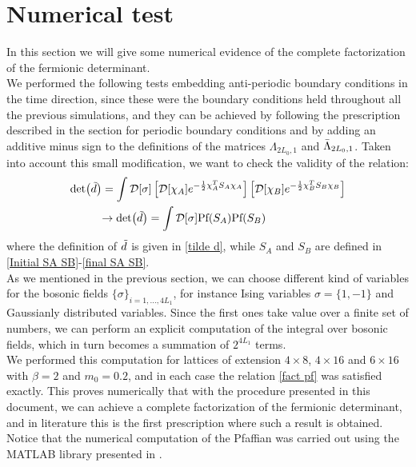 \section{Numerical test}
In this section we will give some numerical evidence of the complete factorization of the fermionic determinant.
\\ We performed the following tests embedding anti-periodic boundary conditions in the time direction, since these were the boundary conditions held throughout all the previous simulations, and they can be achieved by following the prescription described in the section for periodic boundary conditions and by adding an additive minus sign to the definitions of the matrices $\Lambda_{2L_0, 1}$ and $\Bar{\Lambda}_{2L_0, 1}$. Taken into account this small modification, we want to check the validity of the relation:
\begin{equation}\label{fact pf}
\begin{split}
\det (\Tilde{d}) = \int \mathcal{D}[\sigma] \left[\mathcal{D}[\chi_A] e^{-\frac{1}{2}\chi_A^T S_A \chi_A} \right] \left[\mathcal{D}[\chi_B] e^{-\frac{1}{2}\chi_B^T S_B \chi_B} \right] \\
        \rightarrow \det(\Tilde{d}) = \int \mathcal{D}[\sigma] \textrm{Pf}(S_A)\textrm{Pf}(S_B) \hspace{25mm}
\end{split}
\end{equation}
where the definition of $\Tilde{d}$ is given in \eqref{tilde d}, while $S_A$ and $S_B$ are defined in \eqref{Initial SA SB}-\eqref{final SA SB}.
\\ As we mentioned in the previous section, we can choose different kind of variables for the bosonic fields $\{\sigma\}_{i = 1, \dots, 4L_1}$, for instance Ising variables $\sigma = \{1, -1\}$ and Gaussianly distributed variables. Since the first ones take value over a finite set of numbers, we can perform an explicit computation of the integral over bosonic fields, which in turn becomes a summation of $2^{4L_1}$ terms.
\\ We performed this computation for lattices of extension $4 \times 8$, $4 \times 16$ and $6 \times 16$ with $\beta = 2$ and $m_0 = 0.2$, and in each case the relation \eqref{fact pf} was satisfied exactly. This proves numerically that with the procedure presented in this document, we can achieve a complete factorization of the fermionic determinant, and in literature this is the first prescription where such a result is obtained. 
Notice that the numerical computation of the Pfaffian was carried out using the MATLAB library presented in \cite{Wimmer_2012}. 
